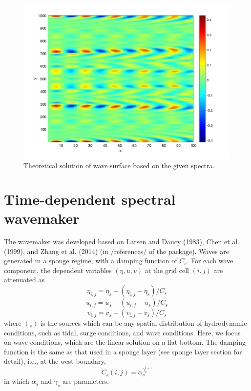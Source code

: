 \documentclass[preprint,10pt]{elsarticle}
\newcommand{\be}{\begin{equation}}
\newcommand{\ee}{\end{equation}}
\begin{document}
 \begin{figure}
\begin{center}
 \includegraphics[width=1.0\textwidth]{figures/theory.jpg}
 \caption{Theoretical solution of wave surface based on the given spectra.}
 \label{theoretical}
 \end{center}
 \end{figure}

\section{Time-dependent spectral wavemaker}

The wavemaker was developed based on Larsen and Dancy (1983), Chen et al. (1999), and Zhang et al. (2014) (in /references/ of the package). Waves are generated in a sponge regime, with a damping function of $C_s$. For each wave component, the dependent variables $(\eta, u, v)$ at the grid cell $(i,j)$ are attenuated as
\be
\eta_{i,j} = \eta_{s} + (\eta_{i,j}  - \eta_{s})/C_s
\ee
\be
u_{i,j}  = u_{s} + (u_{i,j}  - u_{s})/C_s
\ee
\be
v_{i,j}  = v_{s} + (v_{i,j}  - v_{s})/C_s
\ee
where $(_{s})$ is the sources which can be any spatial distribution of hydrodynamic conditions, such as tidal, surge conditions, and wave conditions. Here, we focus on wave conditions, which are the linear solution on a flat bottom. The damping function is the   
 same as that used in a sponge layer (see sponge layer section for detail), i.e., at the west boundary,
 \be
 C_s (i,j) = \alpha_s^{\gamma_s^{i-1}}
 \ee
 in which $\alpha_s$ and $\gamma_s$ are parameters. 
 
\end{document}
